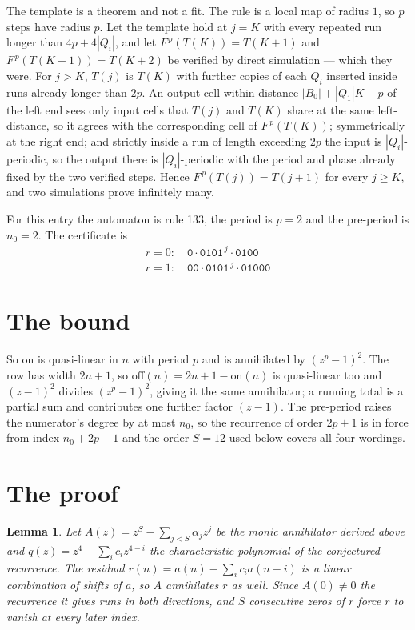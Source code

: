 \documentclass[11pt,a4paper]{article}
\theoremstyle{plain}
\newtheorem{lemma}[theorem]{Lemma}
\theoremstyle{definition}
\begin{document}
The template is a theorem and not a fit. The rule is a local map of radius $1$, so $p$ steps
have radius $p$. Let the template hold at $j=K$ with every repeated run longer than
$4p+4|Q_i|$, and let $F^{\,p}(T(K))=T(K+1)$ and $F^{\,p}(T(K+1))=T(K+2)$ be verified by direct
simulation --- which they were. For $j>K$, $T(j)$ is $T(K)$ with further copies of each $Q_i$
inserted inside runs already longer than $2p$. An output cell within distance
$|B_0|+|Q_1|K-p$ of the left end sees only input cells that $T(j)$ and $T(K)$ share at the same
left-distance, so it agrees with the corresponding cell of $F^{\,p}(T(K))$; symmetrically at
the right end; and strictly inside a run of length exceeding $2p$ the input is
$|Q_i|$-periodic, so the output there is $|Q_i|$-periodic with the period and phase already
fixed by the two verified steps. Hence $F^{\,p}(T(j))=T(j+1)$ for every $j\ge K$, and two
simulations prove infinitely many.

For this entry the automaton is rule 133, the period is $p=2$ and the pre-period is $n_0=2$.
The certificate is
\begin{gather*}
r=0:\quad \texttt{0} \cdot \texttt{0101}^{\,j} \cdot \texttt{0100} \\
r=1:\quad \texttt{00} \cdot \texttt{0101}^{\,j} \cdot \texttt{01000}
\end{gather*}

\section{The bound}

So $\mathrm{on}$ is quasi-linear in $n$ with period $p$ and is annihilated by
$(z^p-1)^2$. The row has width $2n+1$, so $\mathrm{off}(n)=2n+1-\mathrm{on}(n)$ is quasi-linear
too and $(z-1)^2$ divides $(z^p-1)^2$, giving it the same annihilator; a running total is a
partial sum and contributes one further factor $(z-1)$. The pre-period raises the numerator's
degree by at most $n_0$, so the recurrence of order $2p+1$ is in force from index $n_0+2p+1$
and the order $S=12$ used below covers all four wordings.

\section{The proof}

\begin{lemma}\label{lem:crit}
Let $A(z)=z^S-\sum_{j<S}\alpha_jz^{j}$ be the monic annihilator derived above and
$q(z)=z^{4}-\sum_ic_iz^{4-i}$ the characteristic polynomial of the conjectured
recurrence. The residual $r(n)=a(n)-\sum_ic_ia(n-i)$ is a linear combination of shifts of $a$,
so $A$ annihilates $r$ as well. Since $A(0)\ne0$ the recurrence it gives runs in both
directions, and $S$ consecutive zeros of $r$ force $r$ to vanish at every later index.
\end{lemma}
\end{document}
